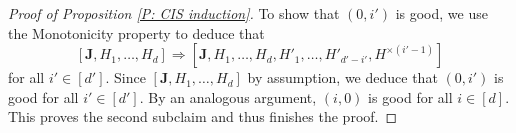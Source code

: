 \documentclass[11pt]{amsart}
\theoremstyle{definition}
\newcommand{\bJ}{{\mathbf{J}}}
\newcommand{\1}{{\mathbf{1}}}
\begin{document}
\begin{proof}[Proof of Proposition \ref{P: CIS induction}]
	To show that $(0,i')$ is good, we use the Monotonicity property to deduce that
	$$[\bJ, H_{1},\dots,H_{d}]\Rightarrow [\bJ, H_{1},\dots,H_{d},H'_{1},\dots,H'_{d'-i'},H^{\times(i'-1)}]$$
	for all $i'\in[d']$. Since $[\bJ, H_{1},\dots,H_{d}]$ by assumption, we deduce that $(0,i')$ is good for all $i'\in[d']$. By an analogous argument, $(i,0)$ is good for all $i\in[d]$. This proves the second subclaim and thus finishes the proof.
%
%	

\end{proof}
\end{document}
